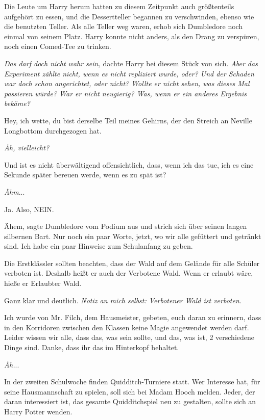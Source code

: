 Die Leute um Harry herum hatten zu diesem Zeitpunkt auch größtenteils aufgehört
zu essen, und die Dessertteller begannen zu verschwinden, ebenso wie die
benutzten Teller. Als alle Teller weg waren, erhob sich Dumbledore noch einmal
von seinem Platz. Harry konnte nicht anders, als den Drang zu verspüren, noch
einen Comed-Tee zu trinken.

\emph{Das darf doch nicht wahr sein,} dachte Harry bei diesem Stück von sich.
\emph{Aber das Experiment zählte nicht, wenn es nicht repliziert wurde, oder?
Und der Schaden war doch schon angerichtet, oder nicht? Wollte er nicht sehen,
was dieses Mal passieren würde? War er nicht neugierig? Was, wenn er ein anderes
Ergebnis bekäme?}

Hey, ich wette, du bist derselbe Teil meines Gehirns, der den Streich an Neville
Longbottom durchgezogen hat.

\emph{Äh, vielleicht?}

Und ist es nicht überwältigend offensichtlich, dass, wenn ich das tue, ich es
eine Sekunde später bereuen werde, wenn es zu spät ist?

\emph{Ähm}...

Ja. Also, NEIN.

\glqq{}Ähem\grqq{}, sagte Dumbledore vom Podium aus und strich sich über seinen
langen silbernen Bart. \glqq{}Nur noch ein paar Worte, jetzt, wo wir alle
gefüttert und getränkt sind. Ich habe ein paar Hinweise zum Schulanfang zu
geben.\grqq{}

\glqq{}Die Erstklässler sollten beachten, dass der Wald auf dem Gelände für alle
Schüler verboten ist. Deshalb heißt er auch der Verbotene Wald. Wenn er erlaubt
wäre, hieße er Erlaubter Wald.\grqq{}

Ganz klar und deutlich.
\emph{Notiz an mich selbst: Verbotener Wald ist verboten.}

\glqq{}Ich wurde von Mr. Filch, dem Hausmeister, gebeten, euch daran zu
erinnern, dass in den Korridoren zwischen den Klassen keine Magie angewendet
werden darf. Leider wissen wir alle, dass das, was sein sollte, und das, was
ist, 2 verschiedene Dinge sind. Danke, dass ihr das im Hinterkopf
behaltet.\grqq{}

\emph{Äh.}..

\glqq{}In der zweiten Schulwoche finden Quidditch-Turniere statt. Wer Interesse
hat, für seine Hausmannschaft zu spielen, soll sich bei Madam Hooch melden.
Jeder, der daran interessiert ist, das gesamte Quidditchspiel neu zu gestalten,
sollte sich an Harry Potter wenden.\grqq{}

